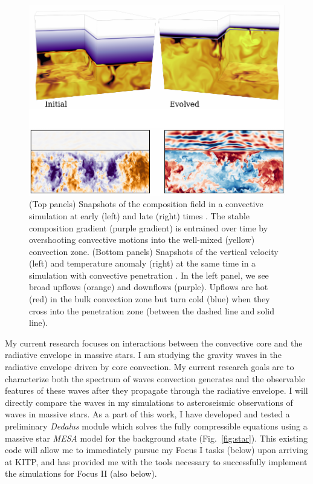 \documentclass[12pt]{article} %
\begin{document}
\begin{figure}[t!]
     \centering
     \captionsetup{width=0.97\linewidth}
     \includegraphics[width=\textwidth]{past_cbm.pdf}
        \caption{
        (Top panels) Snapshots of the composition field in a convective simulation at early (left) and late (right) times \citep{anders_etal_2022b}. 
        The stable composition gradient (purple gradient) is entrained over time by overshooting convective motions into the well-mixed (yellow) convection zone.
        (Bottom panels) Snapshots of the vertical velocity (left) and temperature anomaly (right) at the same time in a simulation with convective penetration \citep{anders_etal_2022a}. 
        In the left panel, we see broad upflows (orange) and downflows (purple). 
        Upflows are hot (red) in the bulk convection zone but turn cold (blue) when they cross into the penetration zone (between the dashed line and solid line).
        \label{fig:past_cbm}}
        \vspace{-0.3cm}
\end{figure}



My current research focuses on interactions between the convective core and the radiative envelope in massive stars.
I am studying the gravity waves in the radiative envelope driven by core convection.
My current research goals are to characterize both the spectrum of waves convection generates and the observable features of these waves after they propagate through the radiative envelope.
I will directly compare the waves in my simulations to asteroseismic observations of waves in massive stars.
As a part of this work, I have developed and tested a preliminary \emph{Dedalus} module which solves the fully compressible equations using a massive star \emph{MESA} model for the background state (Fig.~\ref{fig:star}).
This existing code will allow me to immediately pursue my Focus I tasks (below) upon arriving at KITP, and has provided me with the tools necessary to successfully implement the simulations for Focus II (also below).
\end{document}
